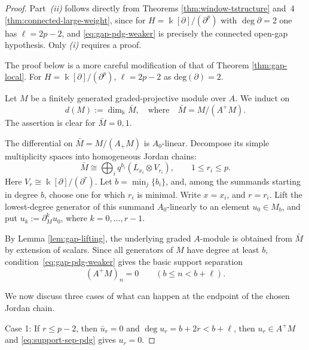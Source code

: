 \documentclass[11pt]{article}
\theoremstyle{definition}
\numberwithin{equation}{section}
\newcommand{\kk}{\Bbbk}
\begin{document}
\begin{proof}
Part~\emph{(ii)} follows directly from Theorems \ref{thm:window-tstructure} and~4 \ref{thm:connected-large-weight}, since for
$H=\kk[\partial]/(\partial^p)$ with $\deg\partial=2$ one has
$\ell=2p-2$, and \eqref{eq:gap-pdg-weaker} is precisely the connected open-gap hypothesis. Only \emph{(i)} requires a proof. 

The proof below is a more careful modification of that of Theorem \ref{thm:gap-local}. For $H=\kk[\partial]/(\partial^p)$, $\ell=2p-2$ as $\mathrm{deg}(\partial)=2$.

Let $M$ be a finitely generated graded-projective module over $A$. We induct on
\begin{equation}\label{eqn}
d(M):=\dim_\kk\bar{M},
\quad \textrm{where} \quad
\bar{M}=M/(A^+M).
\end{equation}
The assertion is clear for $\bar{M}=0,1$.   

The differential on
$\bar{M}=M/(A_+ M)$ is $A_0$-linear.  Decompose its simple
multiplicity spaces into homogeneous Jordan chains:
\begin{equation}\label{eq:barM-decomp}
 \bar{M}\cong\bigoplus_i
 q^{b_i}\left(L_{x_i}\otimes V_{r_i}\right),
 \qquad 1\le r_i\le p.
\end{equation}
Here $V_r\cong \kk[\partial]/(\partial^{r})$.
Let $ b=\min_j\{ b_i\}$, and, among the summands starting in degree $b$, choose one for which $r_i$ is minimal. Write
$x=x_i$, and $r=r_i$.
Lift the lowest-degree generator of this summand $A_0$-linearly to an element $u_0\in M_b$, and put
$u_k:=\partial_M^k u_0$, where $k=0,\dots, r-1$.

By Lemma \ref{lem:gap-lifting}, the underlying graded $A$-module is obtained from $\bar{M}$ by extension of scalars. Since all generators of $M$ have degree at least $b$, condition~\eqref{eq:gap-pdg-weaker} gives the basic support separation
\begin{equation}\label{eq:support-sep-pdg}
(A^+M)_n=0
\qquad
(b\le n<b+\ell).
\end{equation}

We now discuss three cases of what can happen at the endpoint of the chosen Jordan chain. 

Case 1: If $r\le p-2$, then $\bar{u}_r=0$ and
$\deg u_r=b+2r<b+\ell$,
then $u_r\in A^+M$ and \eqref{eq:support-sep-pdg} gives $u_r=0$.


\end{proof}
\end{document}
